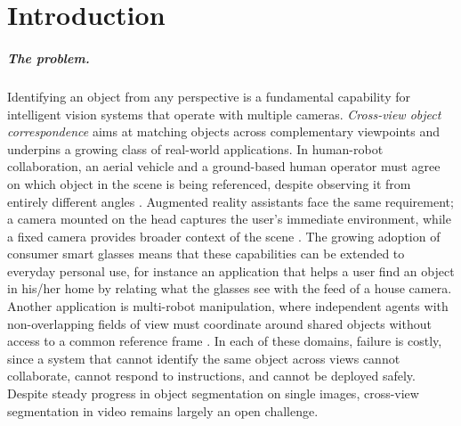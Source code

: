 \chapter{Introduction}
\label{chap:intro}

\paragraph{The problem.} Identifying an object from any perspective is a fundamental capability for intelligent vision systems that operate with multiple cameras. \textit{Cross-view object correspondence} aims
at matching objects across complementary viewpoints and underpins a growing class of real-world applications. In human-robot collaboration, an aerial vehicle and a ground-based human operator must agree on which
object in the scene is being referenced, despite observing it from entirely different angles \cite{collab_1, collab_2}. Augmented reality assistants face the same requirement; a camera mounted on the head
captures the user's immediate environment, while a fixed camera provides broader context of the scene \cite{wearable}. The growing adoption of consumer smart glasses means that these capabilities can be extended
to everyday personal use, for instance an application that helps a user find an object in his/her home by relating what the glasses see with the feed of a house camera. Another application is multi-robot
manipulation, where independent agents with non-overlapping fields of view must coordinate around shared objects without access to a common reference frame \cite{multirobot_1, multirobot_2}. In each of these
domains, failure is costly, since a system that cannot identify the same object across views cannot collaborate, cannot respond to instructions, and cannot be deployed safely. Despite steady progress in object
segmentation on single images, cross-view segmentation in video remains largely an open challenge.

